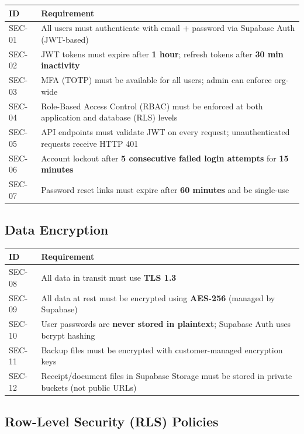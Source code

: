 \documentclass[journal, a4paper, onecolumn, 12pt]{IEEEtran}
\begin{document}
\begin{longtable}{|p{}|p{}|}
\hline
ID & Requirement \\ \hline
\hline
SEC-01 & All users must authenticate with email + password via Supabase Auth (JWT-based) \\ \hline
SEC-02 & JWT tokens must expire after \textbf{1 hour}; refresh tokens after \textbf{30 min inactivity} \\ \hline
SEC-03 & MFA (TOTP) must be available for all users; admin can enforce org-wide \\ \hline
SEC-04 & Role-Based Access Control (RBAC) must be enforced at both application and database (RLS) levels \\ \hline
SEC-05 & API endpoints must validate JWT on every request; unauthenticated requests receive HTTP 401 \\ \hline
SEC-06 & Account lockout after \textbf{5 consecutive failed login attempts} for \textbf{15 minutes} \\ \hline
SEC-07 & Password reset links must expire after \textbf{60 minutes} and be single-use \\ \hline
\end{longtable}
\subsection{Data Encryption}

\begin{longtable}{|p{}|p{}|}
\hline
ID & Requirement \\ \hline
\hline
SEC-08 & All data in transit must use \textbf{TLS 1.3} \\ \hline
SEC-09 & All data at rest must be encrypted using \textbf{AES-256} (managed by Supabase) \\ \hline
SEC-10 & User passwords are \textbf{never stored in plaintext}; Supabase Auth uses bcrypt hashing \\ \hline
SEC-11 & Backup files must be encrypted with customer-managed encryption keys \\ \hline
SEC-12 & Receipt/document files in Supabase Storage must be stored in private buckets (not public URLs) \\ \hline
\end{longtable}
\subsection{Row-Level Security (RLS) Policies}
\end{document}
